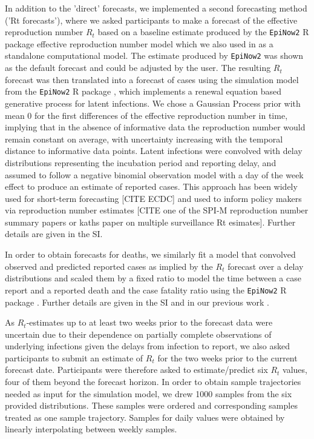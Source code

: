 \documentclass[10pt,a4paper,twocolumn]{article}
\begin{document}
In addition to the 'direct' forecasts, we implemented a second forecasting method ('Rt forecasts'), where we asked participants to make a forecast of the effective reproduction number $R_t$ based on a baseline estimate produced by the \texttt{EpiNow2} \textsf{R} package effective reproduction number model \citep{epinow2} which we also used in \cite{bosseComparingHumanModelbased2022} as a standalone computational model. The estimate produced by \texttt{EpiNow2} was shown as the default forecast and could be adjusted by the user. The resulting $R_t$ forecast was then translated into a forecast of cases using the simulation model from the \texttt{EpiNow2} \textsf{R} package \citep{epinow2}, which implements a renewal equation based \citep{fraserEstimatingIndividualHousehold2007} generative process for latent infections. We chose a Gaussian Process prior with mean 0 for the first differences of the effective reproduction number in time, implying that in the absence of informative data the reproduction number would remain constant on average, with uncertainty increasing with the temporal distance to informative data points. Latent infections were convolved with delay distributions representing the incubation period and reporting delay, and assumed to follow a negative binomial observation model with a day of the week effect to produce an estimate of reported cases. This approach has been widely used for short-term forecasting \cite{bosseComparingHumanModelbased2022} [CITE ECDC] and used to inform policy makers via reproduction number estimates [CITE one of the SPI-M reproduction number summary papers or kaths paper on multiple surveillance Rt esimates]. Further details are given in the SI.

In order to obtain forecasts for deaths, we similarly fit a model that convolved observed and predicted reported cases as implied by the $R_t$ forecast over a  delay distributions \cite{sherrattExploringSurveillanceData2021, abbottEstimatingTimevaryingReproduction2020a} and scaled them by a fixed ratio to model the time between a case report and a reported death and the case fatality ratio using the \texttt{EpiNow2} \textsf{R} package \citep{epinow2}. Further details are given in the SI and in our previous work \citep{bosseComparingHumanModelbased2022}.

As $R_t$-estimates up to at least two weeks prior to the forecast data were uncertain due to their dependence on partially complete observations of underlying infections given the delays from infection to report, we also asked participants to submit an estimate of $R_t$ for the two weeks prior to the current forecast date. Participants were therefore asked to estimate/predict six $R_t$ values, four of them beyond the forecast horizon. In order to obtain sample trajectories needed as input for the simulation model, we drew 1000 samples from the six provided distributions. These samples were ordered and corresponding samples treated as one sample trajectory. Samples for daily values were obtained by linearly interpolating between weekly samples. 
\end{document}
